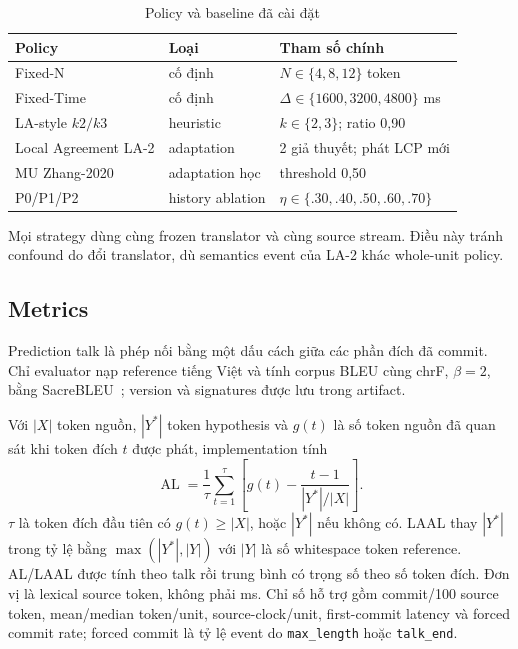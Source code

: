 \documentclass[conference]{IEEEtran}
\begin{document}
\begin{table}[t]
\caption{Policy và baseline đã cài đặt}
\label{tab:strategies}
\centering
\scriptsize
\begin{tabular}{p{}p{}p{}}
\toprule
Policy & Loại & Tham số chính \\
\midrule
Fixed-N & cố định & $N\in\{4,8,12\}$ token \\
Fixed-Time & cố định & $\Delta\in\{1600,3200,4800\}$ ms \\
LA-style $k2/k3$ & heuristic & $k\in\{2,3\}$; ratio 0,90 \\
Local Agreement LA-2 & adaptation & 2 giả thuyết; phát LCP mới \\
MU Zhang-2020 & adaptation học & threshold 0,50 \\
P0/P1/P2 & history ablation & $\eta\in\{.30,.40,.50,.60,.70\}$ \\
\bottomrule
\end{tabular}
\end{table}

Mọi strategy dùng cùng frozen translator và cùng source stream. Điều này tránh confound do đổi translator, dù semantics event của LA-2 khác whole-unit policy.

\subsection{Metrics}
Prediction talk là phép nối bằng một dấu cách giữa các phần đích đã commit. Chỉ evaluator nạp reference tiếng Việt và tính corpus BLEU cùng chrF, $\beta=2$, bằng SacreBLEU~\cite{post2018sacrebleu}; version và signatures được lưu trong artifact.

Với $|X|$ token nguồn, $|Y^*|$ token hypothesis và $g(t)$ là số token nguồn đã quan sát khi token đích $t$ được phát, implementation tính
\begin{equation}
\operatorname{AL}=\frac{1}{\tau}\sum_{t=1}^{\tau}
\left[g(t)-\frac{t-1}{|Y^*|/|X|}\right].
\label{eq:al}
\end{equation}
$\tau$ là token đích đầu tiên có $g(t)\geq|X|$, hoặc $|Y^*|$ nếu không có. LAAL thay $|Y^*|$ trong tỷ lệ bằng $\max(|Y^*|,|Y|)$ với $|Y|$ là số whitespace token reference. AL/LAAL được tính theo talk rồi trung bình có trọng số theo số token đích. Đơn vị là lexical source token, không phải ms. Chỉ số hỗ trợ gồm commit/100 source token, mean/median token/unit, source-clock/unit, first-commit latency và forced commit rate; forced commit là tỷ lệ event do \texttt{max\_length} hoặc \texttt{talk\_end}.
\end{document}
